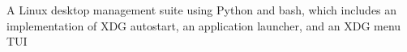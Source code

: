 \begin{project}

  \begin{projectdescription}
    A Linux desktop management suite using Python and bash, which includes an
    implementation of XDG autostart, an application launcher, and an
    XDG menu TUI
  \end{projectdescription}
\end{project}
